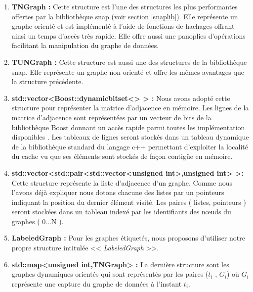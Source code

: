 \begin{enumerate}[label=(\alph*)]
\item \textbf{TNGraph :}
Cette structure est l'une des structures les plus performantes offertes par la bibliothèque 	 \gls{snap} (voir section \ref{snaplib}). Elle représente un graphe orienté et est implémenté à l'aide de fonctions de hachages offrant ainsi un temps d'accès très rapide. Elle offre aussi une panoplies d'opérations facilitant la manipulation du graphe de données.

\item\textbf{TUNGraph :}
Cette structure est aussi une des structures de la bibliothèque \gls{snap}. Elle représente un graphe non orienté et offre les mêmes avantages que la structure précédente. 

\item\textbf{std::vector<Boost::dynamicbitset<> > :}
 Nous avons adopté cette structure pour représenter la matrice d'adjacence en mémoire. Les lignes de la matrice d'adjacence sont représentées par un vecteur de bits de la bibliothèque Boost donnant un accès rapide parmi toutes les implémentation disponibles  \citep{pieterse2010performance}. Les tableaux de lignes seront stockés dans un tableau dynamique de la bibliothèque standard du langage c++ permettant d'exploiter la localité du cache vu que ses éléments sont stockés de façon contigüe en mémoire.
 
\item\textbf{std::vector<std::pair<std::vector<unsigned int>,unsigned int> >:}
Cette structure représente la liste d'adjacence d'un graphe. Comme nous l'avons déjà expliquer nous dotons chacune des listes par un pointeurs indiquant la position du dernier élément visité. Les paires ( listes, pointeurs ) seront stockées dans un tableau indexé par les identifiants des nœuds du graphes ( 0...N ).

\item\textbf{LabeledGraph :} Pour les graphes étiquetés, nous proposons d'utiliser notre propre structure intitulée << \textit{LabeledGraph} >>.

\item \textbf{std::map<unsigned int,TNGraph> :}
La dernière structure sont les graphes dynamiques orientés qui sont représentés par les paires ($t_i$ , $G_i$) où $G_i$ représente une capture du graphe de données à l'instant $t_i$.


\end{enumerate}



